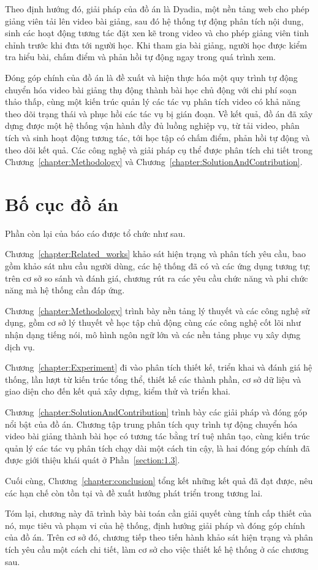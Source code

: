 \documentclass[../DoAn.tex]{subfiles}
\begin{document}
Theo định hướng đó, giải pháp của đồ án là Dyadia, một nền tảng web cho phép giảng viên tải lên video bài giảng, sau đó hệ thống tự động phân tích nội dung, sinh các hoạt động tương tác đặt xen kẽ trong video và cho phép giảng viên tinh chỉnh trước khi đưa tới người học. Khi tham gia bài giảng, người học được kiểm tra hiểu bài, chấm điểm và phản hồi tự động ngay trong quá trình xem.

Đóng góp chính của đồ án là đề xuất và hiện thực hóa một quy trình tự động chuyển hóa video bài giảng thụ động thành bài học chủ động với chi phí soạn thảo thấp, cùng một kiến trúc quản lý các tác vụ phân tích video có khả năng theo dõi trạng thái và phục hồi các tác vụ bị gián đoạn. Về kết quả, đồ án đã xây dựng được một hệ thống vận hành đầy đủ luồng nghiệp vụ, từ tải video, phân tích và sinh hoạt động tương tác, tới học tập có chấm điểm, phản hồi tự động và theo dõi kết quả. Các công nghệ và giải pháp cụ thể được phân tích chi tiết trong Chương~\ref{chapter:Methodology} và Chương~\ref{chapter:SolutionAndContribution}.

\section{Bố cục đồ án}
\label{section:1.4}
Phần còn lại của báo cáo được tổ chức như sau.

Chương~\ref{chapter:Related_works} khảo sát hiện trạng và phân tích yêu cầu, bao gồm khảo sát nhu cầu người dùng, các hệ thống đã có và các ứng dụng tương tự; trên cơ sở so sánh và đánh giá, chương rút ra các yêu cầu chức năng và phi chức năng mà hệ thống cần đáp ứng.

Chương~\ref{chapter:Methodology} trình bày nền tảng lý thuyết và các công nghệ sử dụng, gồm cơ sở lý thuyết về học tập chủ động cùng các công nghệ cốt lõi như nhận dạng tiếng nói, mô hình ngôn ngữ lớn và các nền tảng phục vụ xây dựng dịch vụ.

Chương~\ref{chapter:Experiment} đi vào phân tích thiết kế, triển khai và đánh giá hệ thống, lần lượt từ kiến trúc tổng thể, thiết kế các thành phần, cơ sở dữ liệu và giao diện cho đến kết quả xây dựng, kiểm thử và triển khai.

Chương~\ref{chapter:SolutionAndContribution} trình bày các giải pháp và đóng góp nổi bật của đồ án. Chương tập trung phân tích quy trình tự động chuyển hóa video bài giảng thành bài học có tương tác bằng trí tuệ nhân tạo, cùng kiến trúc quản lý các tác vụ phân tích chạy dài một cách tin cậy, là hai đóng góp chính đã được giới thiệu khái quát ở Phần~\ref{section:1.3}.

Cuối cùng, Chương~\ref{chapter:conclusion} tổng kết những kết quả đã đạt được, nêu các hạn chế còn tồn tại và đề xuất hướng phát triển trong tương lai.

Tóm lại, chương này đã trình bày bài toán cần giải quyết cùng tính cấp thiết của nó, mục tiêu và phạm vi của hệ thống, định hướng giải pháp và đóng góp chính của đồ án. Trên cơ sở đó, chương tiếp theo tiến hành khảo sát hiện trạng và phân tích yêu cầu một cách chi tiết, làm cơ sở cho việc thiết kế hệ thống ở các chương sau.
\end{document}

